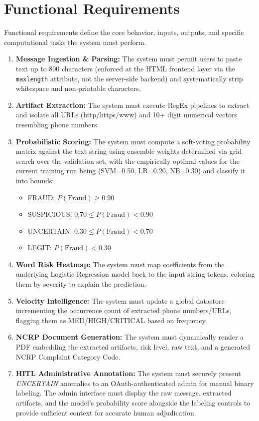 \section{Functional Requirements}
Functional requirements define the core behavior, inputs, outputs, and specific computational tasks the system must perform.
\begin{enumerate}
    \item \textbf{Message Ingestion \& Parsing:} The system must permit users to paste text up to 800 characters (enforced at the HTML frontend layer via the \texttt{maxlength} attribute, not the server-side backend) and systematically strip whitespace and non-printable characters.
    \item \textbf{Artifact Extraction:} The system must execute RegEx pipelines to extract and isolate all URLs (http/https/www) and 10+ digit numerical vectors resembling phone numbers.
    \item \textbf{Probabilistic Scoring:} The system must compute a soft-voting probability matrix against the text string using ensemble weights determined via grid search over the validation set, with the empirically optimal values for the current training run being (SVM=0.50, LR=0.20, NB=0.30) and classify it into bounds: 
    \begin{itemize}
        \item FRAUD: $P(\text{Fraud}) \geq 0.90$
        \item SUSPICIOUS: $0.70 \leq P(\text{Fraud}) < 0.90$
        \item UNCERTAIN: $0.30 \leq P(\text{Fraud}) < 0.70$
        \item LEGIT: $P(\text{Fraud}) < 0.30$
    \end{itemize}
    \item \textbf{Word Risk Heatmap:} The system must map coefficients from the underlying Logistic Regression model back to the input string tokens, coloring them by severity to explain the prediction.
    \item \textbf{Velocity Intelligence:} The system must update a global datastore incrementing the occurrence count of extracted phone numbers/URLs, flagging them as MED/HIGH/CRITICAL based on frequency.
    \item \textbf{NCRP Document Generation:} The system must dynamically render a PDF embedding the extracted artifacts, risk level, raw text, and a generated NCRP Complaint Category Code.
    \item \textbf{HITL Administrative Annotation:} The system must securely present \textit{UNCERTAIN} anomalies to an OAuth-authenticated admin for manual binary labeling. The admin interface must display the raw message, extracted artifacts, and the model's probability score alongside the labeling controls to provide sufficient context for accurate human adjudication.

\end{enumerate}
